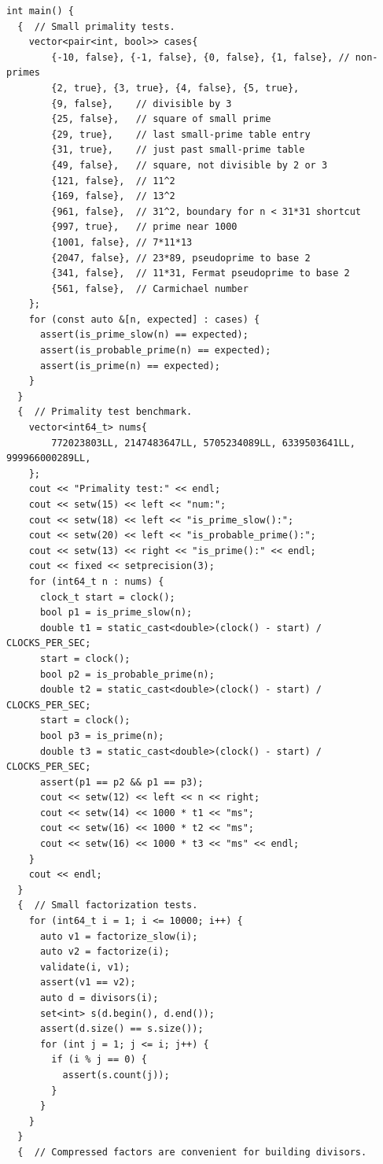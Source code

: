\begin{lstlisting}[style=cpp]
int main() {
  {  // Small primality tests.
    vector<pair<int, bool>> cases{
        {-10, false}, {-1, false}, {0, false}, {1, false}, // non-primes
        {2, true}, {3, true}, {4, false}, {5, true},
        {9, false},    // divisible by 3
        {25, false},   // square of small prime
        {29, true},    // last small-prime table entry
        {31, true},    // just past small-prime table
        {49, false},   // square, not divisible by 2 or 3
        {121, false},  // 11^2
        {169, false},  // 13^2
        {961, false},  // 31^2, boundary for n < 31*31 shortcut
        {997, true},   // prime near 1000
        {1001, false}, // 7*11*13
        {2047, false}, // 23*89, pseudoprime to base 2
        {341, false},  // 11*31, Fermat pseudoprime to base 2
        {561, false},  // Carmichael number
    };
    for (const auto &[n, expected] : cases) {
      assert(is_prime_slow(n) == expected);
      assert(is_probable_prime(n) == expected);
      assert(is_prime(n) == expected);
    }
  }
  {  // Primality test benchmark.
    vector<int64_t> nums{
        772023803LL, 2147483647LL, 5705234089LL, 6339503641LL, 999966000289LL,
    };
    cout << "Primality test:" << endl;
    cout << setw(15) << left << "num:";
    cout << setw(18) << left << "is_prime_slow():";
    cout << setw(20) << left << "is_probable_prime():";
    cout << setw(13) << right << "is_prime():" << endl;
    cout << fixed << setprecision(3);
    for (int64_t n : nums) {
      clock_t start = clock();
      bool p1 = is_prime_slow(n);
      double t1 = static_cast<double>(clock() - start) / CLOCKS_PER_SEC;
      start = clock();
      bool p2 = is_probable_prime(n);
      double t2 = static_cast<double>(clock() - start) / CLOCKS_PER_SEC;
      start = clock();
      bool p3 = is_prime(n);
      double t3 = static_cast<double>(clock() - start) / CLOCKS_PER_SEC;
      assert(p1 == p2 && p1 == p3);
      cout << setw(12) << left << n << right;
      cout << setw(14) << 1000 * t1 << "ms";
      cout << setw(16) << 1000 * t2 << "ms";
      cout << setw(16) << 1000 * t3 << "ms" << endl;
    }
    cout << endl;
  }
  {  // Small factorization tests.
    for (int64_t i = 1; i <= 10000; i++) {
      auto v1 = factorize_slow(i);
      auto v2 = factorize(i);
      validate(i, v1);
      assert(v1 == v2);
      auto d = divisors(i);
      set<int> s(d.begin(), d.end());
      assert(d.size() == s.size());
      for (int j = 1; j <= i; j++) {
        if (i % j == 0) {
          assert(s.count(j));
        }
      }
    }
  }
  {  // Compressed factors are convenient for building divisors.

\end{lstlisting}
